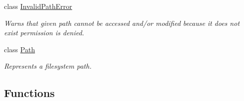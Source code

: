 \begin{DoxyCompactItemize}
class \hyperlink{classchaos_1_1io_1_1sys_1_1_invalid_path_error}{Invalid\+Path\+Error}
\begin{DoxyCompactList}\small\item\em Warns that given path cannot be accessed and/or modified because it does not exist permission is denied. \end{DoxyCompactList}\item 
class \hyperlink{classchaos_1_1io_1_1sys_1_1_path}{Path}
\begin{DoxyCompactList}\small\item\em Represents a filesystem path. \end{DoxyCompactList}\end{DoxyCompactItemize}
\subsection*{Functions}
